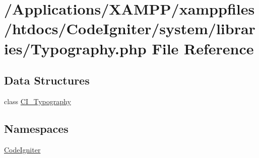 \hypertarget{_typography_8php}{}\section{/\+Applications/\+X\+A\+M\+P\+P/xamppfiles/htdocs/\+Code\+Igniter/system/libraries/\+Typography.php File Reference}
\label{_typography_8php}
\subsection*{Data Structures}
\begin{DoxyCompactItemize}
\item 
class \mbox{\hyperlink{class_c_i___typography}{C\+I\+\_\+\+Typography}}
\end{DoxyCompactItemize}
\subsection*{Namespaces}
\begin{DoxyCompactItemize}
\item 
 \mbox{\hyperlink{namespace_code_igniter}{Code\+Igniter}}
\end{DoxyCompactItemize}
